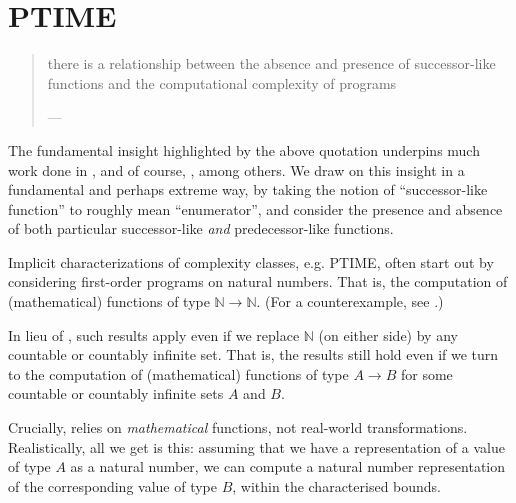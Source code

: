 \chapter{PTIME}

\begin{quotation}

\footnotesize\sffamily\itshape

\begin{flushright}

there is a relationship between the absence and presence of successor-like
functions and the computational complexity of programs

\smallbreak

\upshape

--- \cite{jones-kristiansen-2009}

\end{flushright}

\end{quotation}

The fundamental insight highlighted by the above quotation underpins much work
done in \cite{jones-1999, jones-2001, kristiansen-voda-2005, hofmann-2003,
kristiansen-2008}, and of course, \cite{jones-kristiansen-2009}, among others.
We draw on this insight in a fundamental and perhaps extreme way, by taking the
notion of ``successor-like function'' to roughly mean ``enumerator'', and
consider the presence and absence of both particular successor-like \emph{and}
predecessor-like functions.

Implicit characterizations of complexity classes, e.g. PTIME, often start out
by considering first-order programs on natural numbers. That is, the
computation of (mathematical) functions of type $\mathbb{N} \rightarrow
\mathbb{N}$. (For a counterexample, see \cite{hofmann-2003}.) 

In lieu of , such results apply even if we replace
$\mathbb{N}$ (on either side) by any countable or countably infinite set. That
is, the results still hold even if we turn to the computation of (mathematical)
functions of type $A \rightarrow B$ for some countable or countably infinite
sets $A$ and $B$.

Crucially,  relies on \emph{mathematical} functions, not
real-world transformations. Realistically, all we get is this: assuming that we
have a representation of a value of type $A$ as a natural number, we can
compute a natural number representation of the corresponding value of type $B$,
within the characterised bounds.

